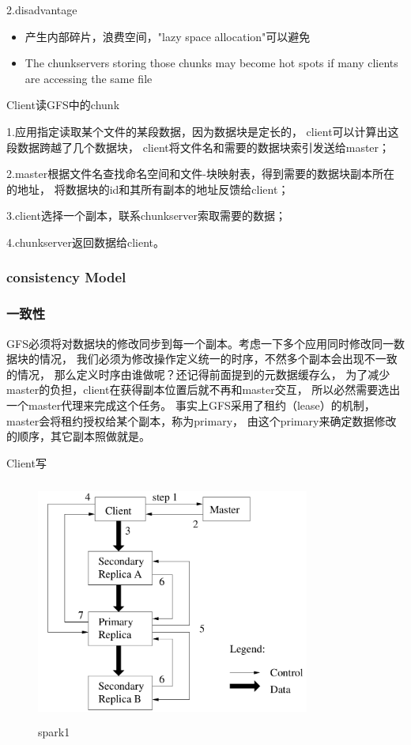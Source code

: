 2.disadvantage
\begin{itemize}
  \item 产生内部碎片，浪费空间，"lazy space allocation"可以避免
  \item The chunkservers storing those chunks may become hot spots if many clients are accessing the same file
\end{itemize}


Client读GFS中的chunk

1.应用指定读取某个文件的某段数据，因为数据块是定长的，
client可以计算出这段数据跨越了几个数据块，
client将文件名和需要的数据块索引发送给master；

2.master根据文件名查找命名空间和文件-块映射表，得到需要的数据块副本所在的地址，
将数据块的id和其所有副本的地址反馈给client；

3.client选择一个副本，联系chunkserver索取需要的数据；

4.chunkserver返回数据给client。

\subsubsection{consistency Model}
\subsubsection{一致性}
GFS必须将对数据块的修改同步到每一个副本。考虑一下多个应用同时修改同一数据块的情况，
我们必须为修改操作定义统一的时序，不然多个副本会出现不一致的情况，
那么定义时序由谁做呢？还记得前面提到的元数据缓存么，
为了减少master的负担，client在获得副本位置后就不再和master交互，
所以必然需要选出一个master代理来完成这个任务。
事实上GFS采用了租约（lease）的机制，master会将租约授权给某个副本，称为primary，
由这个primary来确定数据修改的顺序，其它副本照做就是。

Client写
\begin{figure}[!ht]
    \centering
    \includegraphics[height=8cm,width= 9cm]{img/gfs_write.png}
    \caption{spark1}
\label{spark1}
\end{figure}


